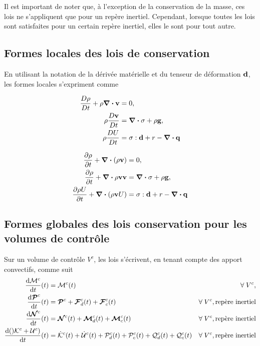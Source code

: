 \documentclass[a4paper,11pt]{report}
\newcommand{\bs}[1]{\boldsymbol{#1}}
\newcommand{\dvm}[2]{\frac{D #1}{D #2}}
\begin{document}
      Il est important de noter que, à l'exception de la conservation de la masse, ces lois ne s'appliquent que pour un repère inertiel. Cependant, lorsque toutes les lois sont satisfaites pour un certain repère inertiel, elles le sont pour tout autre.

    \subsection{Formes locales des lois de conservation}
      En utilisant la notation de la dérivée matérielle et du tenseur de déformation $\vb{d}$, les formes locales s'expriment comme
      \begin{multicols}{2}
        \begin{align}
          \dvm{\rho}{t} + \rho \div \vb{v} &= 0, \nonumber\\
          \rho \dvm{\vb{v}}{t} &= \div \sigma + \rho \vb{g},\nonumber\\
          \rho \dvm{U}{t} &= \vb{\sigma} : \vb{d} + r - \div \vb{q} \nonumber
        \end{align}

        \begin{align}
          \pdv{\rho}{t} + \div (\rho \vb{v}) &= 0, \nonumber \\
          \pdv{\rho}{t} + \div {\rho \vb{v} \vb{v}} &= \div \vb{\sigma} + \rho \vb{g}, \\
          \pdv{\rho U}{t} + \div (\rho \vb{v} U) &= \vb{\sigma} : \vb{d} + r - \div \vb{q} \nonumber
        \end{align}

      \end{multicols}

    \subsection{Formes globales des lois conservation pour les volumes de contrôle}
      Sur un volume de contrôle $V^c$, les lois s'écrivent, en tenant compte des apport convectifs, comme suit
      \begin{equation}\begin{aligned}
        \dv{\mathcal{M}^c}{t} {} (t) &= \mathcal{M}^c(t) & \forall \; V^c, \\
        \dv{\bs{\mathcal{P}}^c}{t} {} (t) &= \bs{\mathcal{P}}^c + \bs{\mathcal{F}}^c_d(t) + \bs{\mathcal{F}}^c_c(t) & \forall \; V^c, \textrm{repère inertiel} \\
        \dv{\bs{\mathcal{N}}^c}{t} {} (t) &= \bs{\mathcal{N}}^c(t) + \bs{\mathcal{M}}^c_d(t) + \bs{\mathcal{M}}^c_c(t) & \forall \; V^c, \textrm{repère inertiel} \\
        \dv{()\mathcal{K}^c + \mathcal{U}^c)}{t} {}(t) &= \dot{\mathcal{K}}^c (t) + \dot{\mathcal{U}}^c(t) + \mathcal{P}^c_d(t) + \mathcal{P}^c_c(t) + \mathcal{Q}^c_d (t) + \mathcal{Q}^c_c (t) &  \forall \; V^c, \textrm{repère inertiel}
      \end{aligned}\end{equation}
\end{document}
